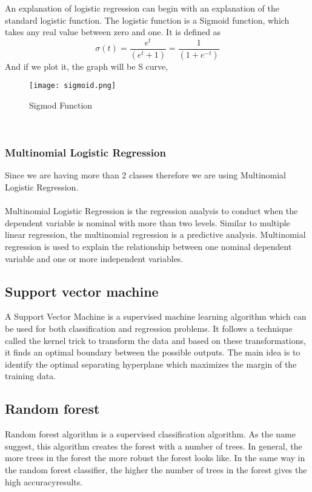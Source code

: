 \documentclass[12pt,a4paper]{report}
\begin{document}
An explanation of logistic regression can begin with an explanation of the standard logistic function. The logistic function is a Sigmoid function, which takes any real value between zero and one. It is defined as
\begin{equation}
\sigma(t)=\frac{e^t}{(e^t+1)} = \frac{1}{(1+e^{-t})} 
\end{equation}
And if we plot it, the graph will be S curve,
\begin{figure}[!h]
	\begin{center}
		\texttt{[image: sigmoid.png]}
		\caption{Sigmod Function \cite{sigmoid}} 
			
\end{center}
\end{figure}\\
\subsubsection{Multinomial Logistic Regression}
Since we are having more than 2 classes therefore we are using Multinomial Logistic Regression.\\
\\
Multinomial Logistic Regression is the regression analysis to conduct when the dependent variable is nominal with more than two levels.  Similar to multiple linear regression, the multinomial regression is a predictive analysis. Multinomial regression is used to explain the relationship between one nominal dependent variable and one or more independent variables.\cite{third}\\

\subsection{Support vector machine}
A Support Vector Machine is a supervised machine learning algorithm which can be used for both classification and regression problems. It follows a technique called the kernel trick to transform the data and based on these transformations, it finds an optimal boundary between the possible outputs.
The main idea is to identify the optimal separating hyperplane which maximizes the margin of the training data.
\subsection{Random forest}
 Random forest algorithm is a supervised classification algorithm. As the name suggest, this algorithm creates the forest with a number of trees.
In general, the more trees in the forest the more robust the forest looks like. In the same way in the random forest classifier, the higher the number of trees in the forest gives the high accuracyresults.
\end{document}
